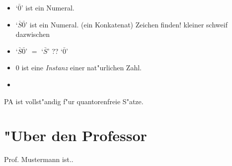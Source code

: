 \documentclass[]{scrartcl}
\begin{document}
\begin{itemize}
  \item `$\bar{0}$' ist ein Numeral.
  \item `$\bar{S}\bar{0}$' ist ein Numeral. (ein Konkatenat) Zeichen finden! kleiner schweif dazwischen
  \item `$\bar{S}\bar{0}$' $=$ `$\bar{S}$' ?? `$\bar{0}$'
  \item $0$ ist eine \emph{Instanz} einer nat"urlichen Zahl.
  \item 
\end{itemize}




PA ist vollst"andig f"ur quantorenfreie S"atze.




\newpage
\section{"Uber den Professor}
Prof. Mustermann ist..
\end{document}
